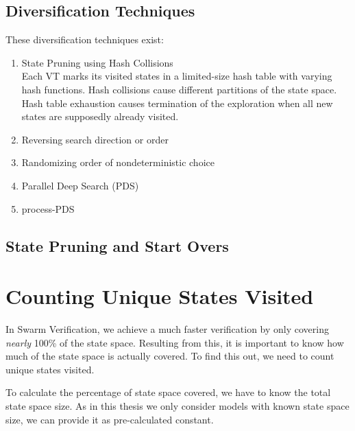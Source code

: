 \documentclass[
fancyheadings, %
%
%
]{stsreprt}
\begin{document}
\subsection{Diversification Techniques}

These diversification techniques exist:

\begin{enumerate}
    \item \textsf{State Pruning using Hash Collisions} \\ Each VT marks its visited states in a limited-size hash table with varying hash functions. Hash collisions cause different partitions of the state space. Hash table exhaustion causes termination of the exploration when all new states are supposedly already visited.
    \item \textsf{Reversing search direction or order}
    \item \textsf{Randomizing order of nondeterministic choice}
    \item \textsf{Parallel Deep Search (PDS)}
    \item \textsf{process-PDS}
\end{enumerate}

\subsection{State Pruning and Start Overs}
\label{section:theory:state-pruning}




\section{Counting Unique States Visited}
\label{section:theory:counting-unique-states-visited}

In Swarm Verification, we achieve a much faster verification by only covering \emph{nearly} 100\% of the state space.
Resulting from this, it is important to know how much of the state space is actually covered.
To find this out, we need to count unique states visited.

To calculate the percentage of state space covered, we have to know the total state space size.
As in this thesis we only consider models with known state space size, we can provide it as pre-calculated constant.
\end{document}
